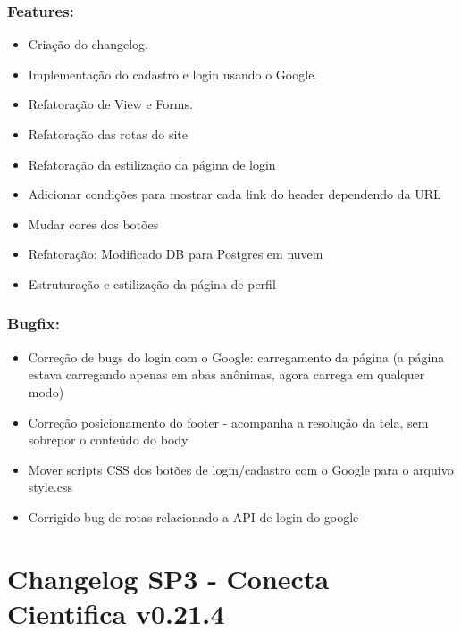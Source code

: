 \documentclass[
40pt,				%
openright,			%
oneside,			%
a4paper,			%
chapter=TITLE,		%
sumario=tradicional,
english,			%
]{abntex2}
\begin{document}
	\subsection*{\textbf{Features:}} %
	\begin{itemize} \setlength\itemsep{0em}
		
		\item Criação do changelog.
		\item Implementação do cadastro e login usando o Google.
		\item Refatoração de View e Forms.
		\item Refatoração das rotas do site
		\item Refatoração da estilização da página de login
		\item Adicionar condições para mostrar cada link do header dependendo da URL
		\item Mudar cores dos botões
		\item Refatoração: Modificado DB para Postgres em nuvem
		\item Estruturação e estilização da página de perfil

	\end{itemize}

	\subsection*{\textbf{Bugfix:}} %
	\begin{itemize} \setlength\itemsep{0em}

		\item Correção de bugs do login com o Google: carregamento da página (a página estava carregando apenas em abas anônimas, agora carrega em qualquer modo)
		\item Correção posicionamento do footer - acompanha a resolução da tela, sem sobrepor o conteúdo do body
		\item Mover scripts CSS dos botões de login/cadastro com o Google para o arquivo style.css
		\item Corrigido bug de rotas relacionado a API de login do google

	\end{itemize}


	\chapter*{Changelog SP3 - Conecta Cientifica v0.21.4} 
	
\end{document}
